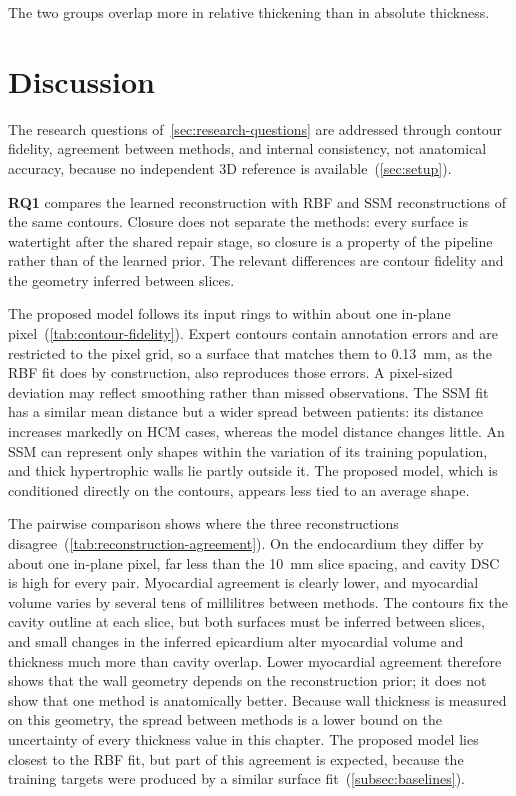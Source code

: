 The two groups overlap more in relative thickening than in absolute thickness.

\FloatBarrier
\endgroup

\section{Discussion}
\label{sec:discussion}
\noindent
The research questions of~\cref{sec:research-questions} are addressed through
contour fidelity, agreement between methods, and internal consistency, not
anatomical accuracy, because no independent 3D reference is
available~(\cref{sec:setup}).

\textbf{RQ1} compares the learned reconstruction with RBF and SSM
reconstructions of the same contours. Closure does not separate the methods:
every surface is watertight after the shared repair stage, so closure is a
property of the pipeline rather than of the learned prior. The relevant
differences are contour fidelity and the geometry inferred between slices.

The proposed model follows its input rings to within about one in-plane pixel~(\cref{tab:contour-fidelity}).
Expert contours contain annotation errors and are restricted to the pixel grid,
so a surface that matches them to 0.13~mm, as the RBF fit does by
construction, also reproduces those errors. A pixel-sized deviation may reflect
smoothing rather than missed observations. The SSM fit has a similar mean
distance but a wider spread between patients: its distance increases markedly
on HCM cases, whereas the model distance changes little. An SSM can represent only shapes within
the variation of its training population, and thick hypertrophic walls lie
partly outside it. The proposed model, which is conditioned directly on the contours,
appears less tied to an average shape.

The pairwise comparison shows where the three reconstructions disagree~(\cref{tab:reconstruction-agreement}). On the endocardium they differ by about
one in-plane pixel, far less than the 10~mm slice spacing, and cavity DSC is
high for every pair. Myocardial agreement is clearly lower, and myocardial
volume varies by several tens of millilitres between methods. The contours fix
the cavity outline at each slice, but
both surfaces must be inferred between slices, and small changes in the
inferred epicardium alter myocardial volume and thickness much more than cavity
overlap. Lower myocardial agreement therefore shows that the wall geometry
depends on the reconstruction prior; it does not show that one method is
anatomically better. Because wall thickness is measured on this geometry, the
spread between methods is a lower bound on the uncertainty of every thickness
value in this chapter.
The proposed model lies closest to the RBF fit, but part of this agreement is expected,
because the training targets were produced by a similar surface fit~(\cref{subsec:baselines}).

